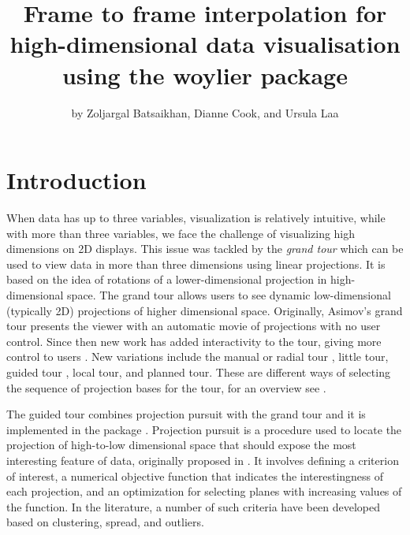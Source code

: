 \title{Frame to frame interpolation for high-dimensional data
visualisation using the woylier package}
\author{by Zoljargal Batsaikhan, Dianne Cook, and Ursula Laa}

\maketitle


\hypertarget{introduction}{%
\section{Introduction}\label{introduction}}

When data has up to three variables, visualization is relatively
intuitive, while with more than three variables, we face the challenge
of visualizing high dimensions on 2D displays. This issue was tackled by
the \emph{grand tour} \citep{asimov_1985} which can be used to view data
in more than three dimensions using linear projections. It is based on
the idea of rotations of a lower-dimensional projection in
high-dimensional space. The grand tour allows users to see dynamic
low-dimensional (typically 2D) projections of higher dimensional space.
Originally, Asimov's grand tour presents the viewer with an automatic
movie of projections with no user control. Since then new work has added
interactivity to the tour, giving more control to users
\citep{buja_cook_asimov_hurley_2005}. New variations include the manual
\citep{cook_manual_1997} or radial tour \citep{mmtour}, little tour,
guided tour \citep{grandtour1995}, local tour, and planned tour. These
are different ways of selecting the sequence of projection bases for the
tour, for an overview see \citet{tourrev}.

The guided tour combines projection pursuit with the grand tour and it
is implemented in the  package \citep{tourr}. Projection
pursuit is a procedure used to locate the projection of high-to-low
dimensional space that should expose the most interesting feature of
data, originally proposed in \citet{kruskal_1969}. It involves defining
a criterion of interest, a numerical objective function that indicates
the interestingness of each projection, and an optimization for
selecting planes with increasing values of the function. In the
literature, a number of such criteria have been developed based on
clustering, spread, and outliers.

